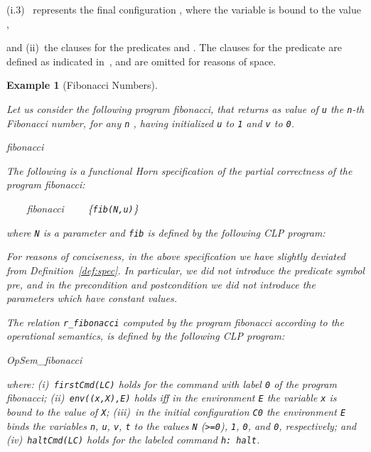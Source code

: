 \documentclass[english]{tlp}
\newtheorem{example}{Example}       \newtheorem{definition}{Definition}
\newcommand{\eop}{\hfill}
\begin{document}
\noindent\hangindent=5mm
(i.3)~ represents the final configuration 
, where the variable  is bound to the value ,

\noindent
and (ii)~the clauses for the predicates 
 and 
. The 
clauses for the predicate  are defined 
as indicated in~\cite{De&14c},
and are omitted for reasons of space.


\vspace{-1mm}
\begin{example}[Fibonacci Numbers]\label{ex:fib}
\begin{rm}
Let us consider the following program \textit{fibonacci}, that returns as value of
{\tt u} 
the {\tt n}-th Fibonacci number, for any {\tt n} , having 
initialized {\tt u} 
to {\tt 1} and {\tt v} to {\tt 0}.
\vspace{.5mm}

\noindent
{\textit{fibonacci}}

\vspace{.5mm}
\noindent
The following is a functional Horn specification of the partial correctness of the program \textit{fibonacci}:

 ~~~~{\textit{fibonacci}}~~~~
{\rm{\{}}{\tt fib(N,u)}{\rm{\}}}\hfill \nopagebreak

\noindent
where {\tt N} is a parameter and 
{\tt fib} is defined by the following CLP program:

\vspace{.5mm}
\noindent

\noindent


\vspace{.5mm}
\noindent

\noindent
For reasons of conciseness, in the above specification  we have 
slightly deviated from Definition~\ref{def:spec}. In particular, 
we did not introduce the predicate symbol {\it pre}, and 
in the precondition and postcondition 
we did not introduce the parameters which have constant values.

The relation {\tt r\_fibonacci} computed by the program \textit{fibonacci} 
according to the operational semantics,
is defined by the following CLP program:


\noindent
\textit{OpSem}_{\textit{\small fibonacci}}

\smallskip
\noindent
where: (i)~{\tt firstCmd(LC)} holds for the command
with label {\tt 0} of the  program \textit{fibo\-nacci};
(ii)~{\tt env((x,X),E)}  holds iff in the environment {\tt E} the variable 
{\tt x} is bound to the value of {\tt X};
(iii)~in the initial configuration {\tt C0} the environment {\tt E}
binds the variables {\tt n}, {\tt u}, {\tt v}, {\tt t} 
to the values
{\tt N} ({\tt >=0}), {\tt 1}, {\tt 0}, and {\tt 0}, respectively; and
(iv)~{\tt haltCmd(LC)} holds for the labeled command {\tt h:\,halt}.\eop
\end{rm}
\end{example}
\end{document}
